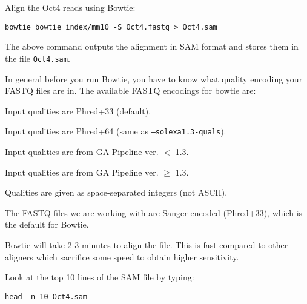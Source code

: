 \begin{steps}
Align the Oct4 reads using Bowtie: 

\begin{lstlisting}
bowtie bowtie_index/mm10 -S Oct4.fastq > Oct4.sam
\end{lstlisting}

The above command outputs the alignment in SAM format and stores them in the
file \texttt{Oct4.sam}.
\end{steps}

\begin{note}
In general before you run Bowtie, you have to know what quality encoding your FASTQ files
are in. The available FASTQ encodings for bowtie are:

\begin{description}[style=multiline,labelindent=0cm,align=right,leftmargin=\descriptionlabelspace,rightmargin=1.5cm,font=\ttfamily]
 \item[--phred33-quals] Input qualities are Phred+33 (default).
 \item[--phred64-quals] Input qualities are Phred+64 (same as \texttt{--solexa1.3-quals}).
 \item[--solexa-quals] Input qualities are from GA Pipeline ver. $<$ 1.3.
 \item[--solexa1.3-quals] Input qualities are from GA Pipeline ver. $\geq$ 1.3.
 \item[--integer-quals] Qualities are given as space-separated integers (not ASCII).
\end{description}

The FASTQ files we are working with are Sanger encoded (Phred+33), which is the
default for Bowtie.

Bowtie will take 2-3 minutes to align the file. This is fast compared to
other aligners which sacrifice some speed to obtain higher sensitivity.
\end{note}

\begin{steps}
Look at the top 10 lines of the SAM file by typing:

\begin{lstlisting}
head -n 10 Oct4.sam
\end{lstlisting}
\end{steps}

